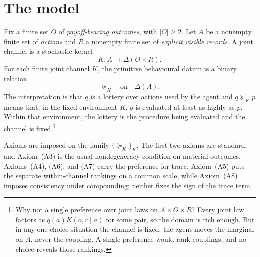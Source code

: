 \documentclass[11pt,a4paper]{article}
\theoremstyle{definition}
\newcommand{\D}{\Delta}
\newcommand{\1}{\mathbf 1}
\begin{document}
\section{The model}\label{sec:model}

Fix a finite set $O$ of \emph{payoff-bearing outcomes}, with $|O|\ge2$.  Let $A$ be a nonempty finite set of
\emph{actions} and $R$ a nonempty finite set of \emph{explicit visible records}.  A joint channel is a stochastic
kernel
\[
  K:A\longrightarrow\D(O\times R).
\]
For each finite joint channel $K$, the primitive behavioural datum is a binary relation
\[
 \succeq_K\quad\text{on}\quad\D(A).
\]
The interpretation is that $q$ is a lottery over actions used by the agent and $q\succeq_Kp$ means that, in the fixed
environment $K$, $q$ is evaluated at least as highly as $p$.  Within that environment, the lottery is the
procedure being evaluated and the channel is fixed.\footnote{Why not a single
preference over joint laws on $A\times O\times R$?  Every joint law factors as $q(a)K(o,r\mid a)$ for some pair,
so the domain is rich enough.  But in any one choice situation the channel is fixed: the agent moves the
marginal on $A$, never the coupling.  A single preference would rank couplings, and no choice reveals those
rankings.} 

\bigskip
Axioms are imposed on the family $\{\succeq_K\}_K$.
The first two axioms are standard, and Axiom~\textup{(A3)} is the usual nondegeneracy condition on material
outcomes.  Axioms~\textup{(A4)}, \textup{(A6)}, and \textup{(A7)} carry the preference for trace.
Axiom~\textup{(A5)} puts the separate within-channel rankings on a common scale, while
Axiom~\textup{(A8)} imposes consistency under compounding; neither fixes the sign of the trace term.
\end{document}
